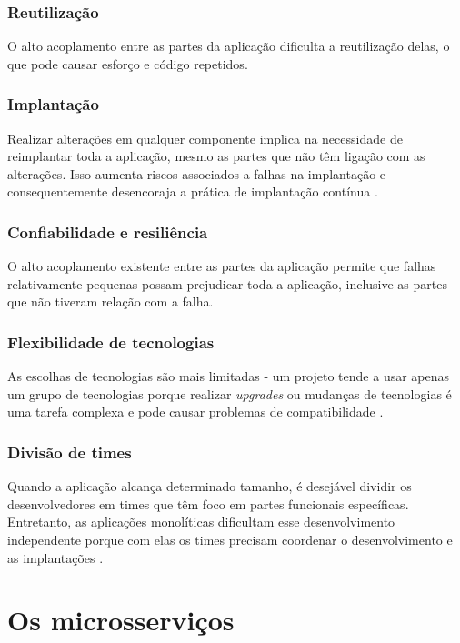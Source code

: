 \subsubsection{Reutilização}
O alto acoplamento entre as partes da aplicação dificulta a reutilização delas, o que pode causar esforço e código repetidos.

\subsubsection{Implantação}
Realizar alterações em qualquer componente implica na necessidade de reimplantar toda a aplicação, mesmo as partes que não têm ligação com as alterações. Isso aumenta riscos associados a falhas na implantação e consequentemente desencoraja a prática de implantação contínua \cite{microservicesIO_monolithic_architecture}.

\subsubsection{Confiabilidade e resiliência}
O alto acoplamento existente entre as partes da aplicação permite que falhas relativamente pequenas possam prejudicar toda a aplicação, inclusive as partes que não tiveram relação com a falha.

\subsubsection{Flexibilidade de tecnologias}
As escolhas de tecnologias são mais limitadas - um projeto tende a usar apenas um grupo de tecnologias porque realizar \emph{upgrades} ou mudanças de tecnologias é uma tarefa complexa e pode causar problemas de compatibilidade \cite{microservicesIO_monolithic_architecture}.

\subsubsection{Divisão de times}
Quando a aplicação alcança determinado tamanho, é desejável dividir os desenvolvedores em times que têm foco em partes funcionais específicas. Entretanto, as aplicações monolíticas dificultam esse desenvolvimento independente porque com elas os times precisam coordenar o desenvolvimento e as implantações \cite{microservicesIO_monolithic_architecture}.

\section{Os microsserviços}

